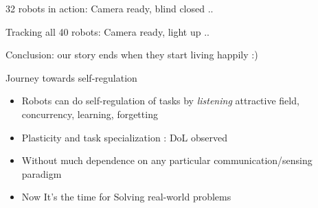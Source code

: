 \documentclass{beamer}
\begin{document}
\begin{frame}[t]{32 robots in action: \alert{Camera ready, blind closed ..}}
\begin{figure}
\centering
{}
\end{figure}
\end{frame}

\begin{frame}[t]{Tracking all 40 robots: \alert{Camera ready, light up ..}}
\begin{figure}
\centering
{} 
\end{figure}
\end{frame}

\begin{frame}[t]{Conclusion: \alert{our story ends when they start living happily :)}}
 \begin{block}{Journey towards self-regulation }
    \begin{itemize}
    \item Robots can do self-regulation of tasks by \alert{{\em listening} attractive field, concurrency, learning, forgetting}
    \item \alert{Plasticity and task specialization} : DoL observed
    \item Without much dependence on any particular \alert{communication/sensing} paradigm
    \item Now It's the time for \alert{Solving real-world problems}
    \end{itemize}
  \end{block}
\end{frame}
\end{document}
